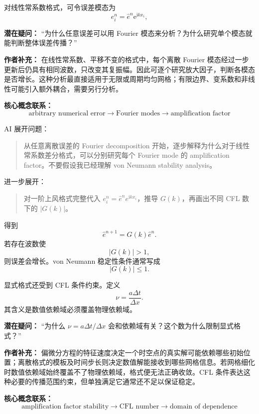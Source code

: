\documentclass[11pt,openany]{ctexbook}
\newcommand{\ee}{\mathrm e}
\newcommand{\ii}{\mathrm i}
\begin{document}
对线性常系数格式，可令误差模态为
\[
e_i^n=\widehat e^n\ee^{\ii kx_i},
\]

\begin{authornote}
\textbf{潜在疑问：}
“为什么任意误差可以用 Fourier 模态来分析？为什么研究单个模态就能判断整体误差传播？”

\textbf{作者补充：}
在线性常系数、平移不变的格式中，每个离散 Fourier 模态经过一步更新后仍具有相同波数，只改变其复振幅。因此可逐个研究放大因子，判断各模态是否增长。这种分析最直接适用于无限或周期均匀网格；有限边界、变系数和非线性可能引入额外耦合，需要另行分析。

\textbf{核心概念联系：}
\[
\text{arbitrary numerical error}
\longrightarrow
\text{Fourier modes}
\longrightarrow
\text{amplification factor}
\]
\end{authornote}

\begin{askai}
AI 展开问题：
\begin{quote}
从任意离散误差的 Fourier decomposition 开始，逐步解释为什么对于线性常系数差分格式，可以分别研究每个 Fourier mode 的 amplification factor。不要假设我已经理解 von Neumann stability analysis。
\end{quote}

进一步展开：
\begin{quote}
对一阶上风格式完整代入 \(e_i^n=\widehat e^n e^{\ii kx_i}\)，推导 \(G(k)\)，再画出不同 CFL 数下的 \(|G(k)|\)。
\end{quote}
\end{askai}

得到
\[
\widehat e^{n+1}=G(k)\widehat e^n.
\]
若存在波数使
\[
|G(k)|>1,
\]
则误差会增长。von Neumann 稳定性条件通常写成
\[
|G(k)|\le1.
\]

显式格式还受到 CFL 条件约束。定义
\[
\nu=\frac{a\Delta t}{\Delta x}.
\]
其含义是数值依赖域必须覆盖物理依赖域。

\begin{authornote}
\textbf{潜在疑问：}
“为什么 \(\nu=a\Delta t/\Delta x\) 会和依赖域有关？这个数为什么限制显式格式？”

\textbf{作者补充：}
偏微分方程的特征速度决定一个时空点的真实解可能依赖哪些初始位置；离散格式的模板及时间步长则决定数值解能接收到哪些网格信息。若网格细化时数值依赖域始终覆盖不了物理依赖域，格式便无法正确收敛。CFL 条件表达这种必要的传播范围约束，但单独满足它通常还不足以保证稳定。

\textbf{核心概念联系：}
\[
\text{amplification factor stability}
\longrightarrow
\text{CFL number}
\longrightarrow
\text{domain of dependence}
\]
\end{authornote}
\end{document}
